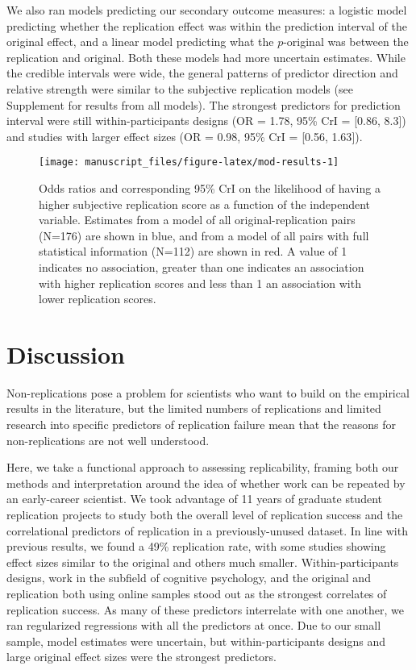 \documentclass[
  english,
  a4paper,
]{article}
\begin{document}
We also ran models predicting our secondary outcome measures: a logistic model predicting whether the replication effect was within the prediction interval of the original effect, and a linear model predicting what the \(p\)-original was between the replication and original. Both these models had more uncertain estimates. While the credible intervals were wide, the general patterns of predictor direction and relative strength were similar to the subjective replication models (see Supplement for results from all models). The strongest predictors for prediction interval were still within-participants designs (OR = 1.78, 95\% CrI = {[}0.86, 8.3{]}) and studies with larger effect sizes (OR = 0.98, 95\% CrI = {[}0.56, 1.63{]}).

\begin{figure}[ht]
\texttt{[image: manuscript\_files/figure-latex/mod-results-1]} \caption{Odds ratios and corresponding 95\% CrI on the likelihood of having a higher subjective replication score as a function of the independent variable. Estimates from a model of all original-replication pairs (N=176) are shown in blue, and from a model of all pairs with full statistical information (N=112) are shown in red. A value of 1 indicates no association, greater than one indicates an association with higher replication scores and less than 1 an association with lower replication scores.}\label{fig:mod-results}
\end{figure}

\hypertarget{discussion}{%
\section{Discussion}\label{discussion}}

Non-replications pose a problem for scientists who want to build on the empirical results in the literature, but the limited numbers of replications and limited research into specific predictors of replication failure mean that the reasons for non-replications are not well understood.

Here, we take a functional approach to assessing replicability, framing both our methods and interpretation around the idea of whether work can be repeated by an early-career scientist. We took advantage of 11 years of graduate student replication projects to study both the overall level of replication success and the correlational predictors of replication in a previously-unused dataset. In line with previous results, we found a 49\% replication rate, with some studies showing effect sizes similar to the original and others much smaller. Within-participants designs, work in the subfield of cognitive psychology, and the original and replication both using online samples stood out as the strongest correlates of replication success. As many of these predictors interrelate with one another, we ran regularized regressions with all the predictors at once. Due to our small sample, model estimates were uncertain, but within-participants designs and large original effect sizes were the strongest predictors.
\end{document}
